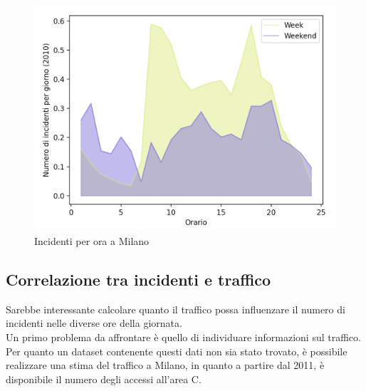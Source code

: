 \documentclass[a4paper]{report}
\begin{document}
\begin{figure}
    \includegraphics[width=\linewidth]{../src/incidenti/incidenti_senza_coords/ore_punta/week_weekend_milano.png}
    \caption{Incidenti per ora a Milano}
    \label{fig:week-weekend-milano}
\end{figure}

\subsection{Correlazione tra incidenti e traffico}

Sarebbe interessante calcolare quanto il traffico possa influenzare il numero di incidenti 
nelle diverse ore della giornata. \\
Un primo problema da affrontare è quello di individuare informazioni sul traffico. 
Per quanto un dataset contenente questi dati non sia stato trovato, 
è possibile realizzare una stima del traffico a Milano, 
in quanto a partire dal 2011, è disponibile il numero degli accessi all'area C.
\end{document}
